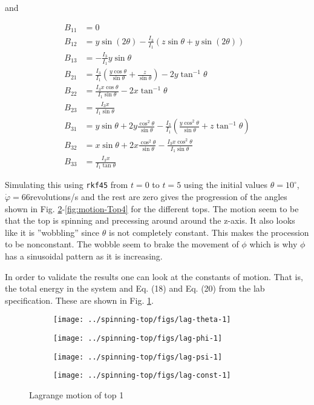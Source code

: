 and

\begin{equation*}
\begin{split}
  B_{11} &= 0 \\
  B_{12} &= y \sin(2\theta) - \frac{I_3}{I_1}(z\sin \theta + y \sin(2\theta)) \\
  B_{13} &= -\frac{I_3}{I_1}y\sin \theta \\
  B_{21} &= \frac{I_3}{I_1}(\frac{y\cos \theta}{\sin \theta} + \frac{z}{\sin \theta}) - 2y\tan^{-1}\theta \\
  B_{22} &= \frac{I_3 x\cos \theta}{I_1 \sin \theta} - 2x \tan^{-1} \theta \\
  B_{23} &= \frac{I_3 x}{I_1 \sin \theta} \\
  B_{31} &= y\sin \theta + 2y \frac{\cos^2 \theta}{\sin \theta} - \frac{I_3}{I_1}( \frac{y \cos^2 \theta}{\sin \theta} + z\tan^{-1} \theta ) \\
  B_{32} &= x \sin \theta + 2x \frac{\cos^2 \theta}{\sin \theta} - \frac{I_3 x \cos^2 \theta}{I_1 \sin \theta} \\
  B_{33} &= \frac{I_3 x}{I_1 \tan \theta}
\end{split}
\end{equation*}

Simulating this using \verb|rkf45| from $t=0$ to $t=5$ using the initial values $\theta = 10^\circ$, $\dot{\varphi} = 66 $revolutions/s and the rest are zero gives the progression of the angles shown in Fig. \ref{fig:motion-Top1}-\ref{fig:motion-Top4} for the different tops. The motion seem to be that the top is spinning and precessing around around the z-axis. It also looks like it is ''wobbling'' since $\theta$ is not completely constant. This makes the procession to be nonconstant. The wobble seem to brake the movement of $\phi$ which is why $\phi$ has a sinusoidal pattern as it is increasing.


In order to validate the results one can look at the constants of motion. That is, the total energy in the system and Eq. (18) and Eq. (20) from the lab specification. These are shown in Fig. \ref{fig:lagE1}.


\begin{figure}[H]
  \centering
  \begin{subfigure}{0.49\textwidth}
    \texttt{[image: ../spinning-top/figs/lag-theta-1]}
    \caption{}
  \end{subfigure}
  \begin{subfigure}{0.49\textwidth}
    \texttt{[image: ../spinning-top/figs/lag-phi-1]}
    \caption{}
  \end{subfigure}
  \begin{subfigure}{0.49\textwidth}
    \texttt{[image: ../spinning-top/figs/lag-psi-1]}
    \caption{}
    \end{subfigure}
  \begin{subfigure}{0.49\textwidth}
    \texttt{[image: ../spinning-top/figs/lag-const-1]}
    \caption{}
    \label{fig:lagE1}
  \end{subfigure}
  \caption{Lagrange motion of top 1}
  \label{fig:motion-Top1}
\end{figure}

